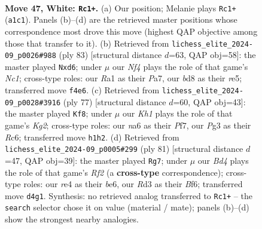 \documentclass[11pt]{article}
\begin{document}
\clearpage

\begin{figure}[p]\centering
\begin{subfigure}{0.46\textwidth}\centering
\resizebox{\linewidth}{!}{%
\newchessgame
\chessboard[
  setfen={r2b4/1p5p/n1k3pP/p4p2/P2BrN2/3R2P1/8/R6K w - - 1 47},
  showmover=false,
  pgfstyle=straightmove, color=movearrow, markmove={a1-c1}
]}
\caption{}
\end{subfigure}\hfill
\begin{subfigure}{0.46\textwidth}\centering
\resizebox{\linewidth}{!}{%
\newchessgame
\chessboard[
  setfen={2nr1k2/p1Rb1p2/3P2p1/4R1Pp/1P5P/PB4K1/8/8 b - - 0 42},
  showmover=false,
  pgfstyle=straightmove, color=movearrow, markmove={c8-d6}
]}
\caption{}
\end{subfigure}
\\[4pt]
\begin{subfigure}{0.46\textwidth}\centering
\resizebox{\linewidth}{!}{%
\newchessgame
\chessboard[
  setfen={8/2b2pk1/r1r3p1/1Rn4p/2Np3P/3P2P1/4RPK1/1B6 b - - 8 39},
  showmover=false,
  pgfstyle=straightmove, color=movearrow, markmove={g7-f8}
]}
\caption{}
\end{subfigure}\hfill
\begin{subfigure}{0.46\textwidth}\centering
\resizebox{\linewidth}{!}{%
\newchessgame
\chessboard[
  setfen={7k/p1r2r2/RnN1Bb1p/1P4p1/8/3R2P1/5P1P/6K1 b - - 2 41},
  showmover=false,
  pgfstyle=straightmove, color=movearrow, markmove={f7-g7}
]}
\caption{}
\end{subfigure}
\caption{\textbf{Move 47, White: \texttt{Rc1+}.} (a) Our position; Melanie plays \texttt{Rc1+} (\texttt{a1c1}). Panels (b)--(d) are the retrieved master positions whose correspondence most drove this move (highest QAP objective among those that transfer to it). (b) Retrieved from \texttt{lichess\_elite\_2024-09\_p0026\#988} (ply 83) [structural distance $d$=63, QAP obj=58]: the master played \texttt{Nxd6}; under $\mu$ our \emph{Nf4} plays the role of that game's \emph{Nc1}; cross-type roles: our \emph{R}a1 as their \emph{P}a7, our \emph{b}d8 as their \emph{r}e5; transferred move \texttt{f4e6}. (c) Retrieved from \texttt{lichess\_elite\_2024-09\_p0028\#3916} (ply 77) [structural distance $d$=60, QAP obj=43]: the master played \texttt{Kf8}; under $\mu$ our \emph{Kh1} plays the role of that game's \emph{Kg2}; cross-type roles: our \emph{n}a6 as their \emph{P}f7, our \emph{P}g3 as their \emph{R}c6; transferred move \texttt{h1h2}. (d) Retrieved from \texttt{lichess\_elite\_2024-09\_p0005\#299} (ply 81) [structural distance $d$=47, QAP obj=39]: the master played \texttt{Rg7}; under $\mu$ our \emph{Bd4} plays the role of that game's \emph{Rf2} (a \textbf{cross-type} correspondence); cross-type roles: our \emph{r}e4 as their \emph{b}e6, our \emph{R}d3 as their \emph{B}f6; transferred move \texttt{d4g1}. Synthesis: no retrieved analog transferred to \texttt{Rc1+} -- the \texttt{search} selector chose it on value (material / mate); panels (b)--(d) show the strongest nearby analogies.}
\label{fig:thought-m92}
\end{figure}
\end{document}
